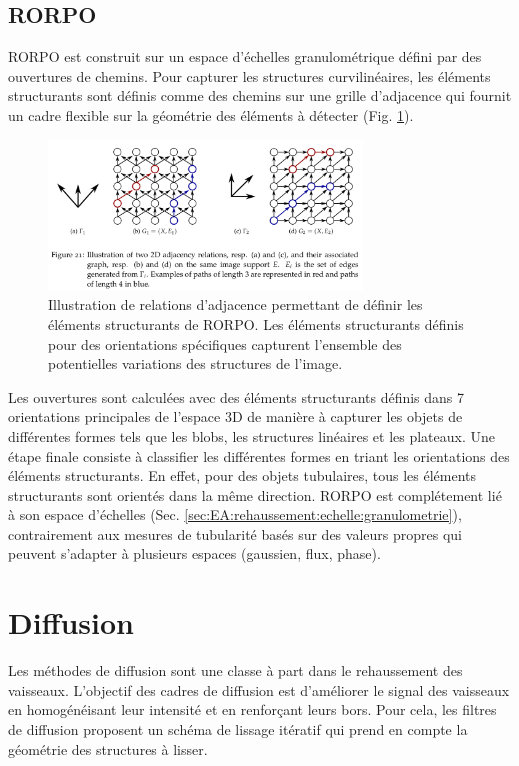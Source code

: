 \subsection{RORPO}

RORPO \cite{Merveille2018_curvilinear} est construit sur un espace d'échelles granulométrique défini par des ouvertures de chemins. Pour capturer les structures curvilinéaires, les éléments structurants sont définis comme des chemins sur une grille d'adjacence qui fournit un cadre flexible sur la géométrie des éléments à détecter (Fig. \ref{fig:rorpo_adjacency}). 

\begin{figure}[ht]
  \centering
  \includegraphics[height=4cm]{Images/rorpo_path.png}
  \caption{Illustration de relations d'adjacence permettant de définir les éléments structurants de RORPO. Les éléments structurants définis pour des orientations spécifiques capturent l'ensemble des potentielles variations des structures de l'image.}
  \label{fig:rorpo_adjacency}
\end{figure}

Les ouvertures sont calculées avec des éléments structurants définis dans 7 orientations principales de l'espace 3D de manière à capturer les objets de différentes formes tels que les blobs, les structures linéaires et les plateaux. Une étape finale consiste à classifier les différentes formes en triant les orientations des éléments structurants. En effet, pour des objets tubulaires, tous les éléments structurants sont orientés dans la même direction. RORPO est complétement lié à son espace d'échelles (Sec. \ref{sec:EA:rehaussement:echelle:granulometrie}), contrairement aux mesures de tubularité basés sur des valeurs propres qui peuvent s'adapter à plusieurs espaces (gaussien, flux, phase).

\section{Diffusion}
\label{sec:EA:rehaussement:diffusion}

Les méthodes de diffusion sont une classe à part dans le rehaussement des vaisseaux. L'objectif des cadres de diffusion est d'améliorer le signal des vaisseaux en homogénéisant leur intensité et en renforçant leurs bors. Pour cela, les filtres de diffusion proposent un schéma de lissage itératif qui prend en compte la géométrie des structures à lisser.

